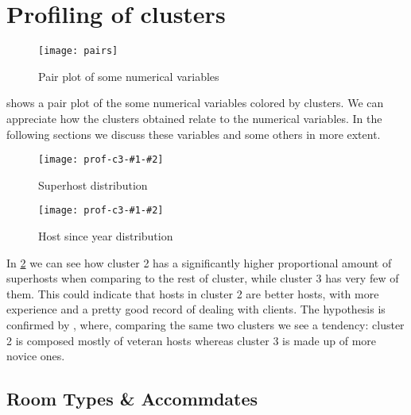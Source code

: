
\section{Profiling of clusters}%
\label{sec:profiling_of_clusters}

\newcommand{\profiling}[3]{
\begin{figure}[H]
    \centering
    \texttt{[image: prof-c3-\#1-\#2]}
    \caption{#3}%
    \label{fig:prof-#1-#2}
\end{figure}
}

\begin{figure}[H]
    \centering
    \texttt{[image: pairs]}
    \caption{Pair plot of some numerical variables}%
    \label{fig:pair}
\end{figure}

 shows a pair plot of the some numerical variables colored by clusters. We
can appreciate how the clusters
obtained relate to the numerical variables. In the following sections we discuss 
these variables and some others in more extent.


\pagebreak

\profiling{host_is_superhost}{side}{Superhost distribution}
\profiling{host_since_year}{percent}{Host since year distribution}
In \cref{fig:prof-host_is_superhost-side} we can see how cluster 2 has a significantly higher proportional amount of superhosts when comparing to the rest of cluster, while cluster 3 has very few of them. This could indicate that hosts in cluster 2 are better hosts, with more experience and a pretty good record of dealing with clients. The hypothesis is confirmed by , where, comparing the same two clusters we see a tendency: cluster 2 is composed mostly of veteran hosts whereas cluster 3 is made up of more novice ones.




\clearpage
\subsection{Room Types \& Accommdates}%




